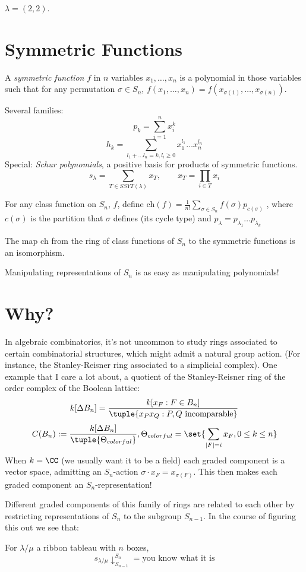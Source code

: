 \documentclass[12pt]{article}
\begin{document}
\begin{example*}
  $\lambda = (2, 2)$.
\end{example*}


\section{Symmetric Functions}
\begin{definition*}
  A \emph{symmetric function} $f$ in $n$ variables $x_1, \dots, x_n$ is a
  polynomial in those variables such that for any permutation $\sigma \in S_n$,
  $f(x_1, \dots, x_n) = f(x_{\sigma(1)}, \dots, x_{\sigma(n)})$. 
\end{definition*}
Several families: 
\[
  p_k = \sum_{i=1}^n x_i^k
\] 
\[
  h_k = \sum_{l_1 + \dots l_n = k, l_i \geq 0} x_1^{l_1} \dots x_n^{l_n}
\]
Special: \emph{Schur polynomials}, a positive basis for products of symmetric
functions.  
\[
  s_\lambda = \sum_{T \in SSYT(\lambda)} x_T, \qquad x_T = \prod_{i \in T} x_i
\] 

\begin{definition*}
  For any class function on $S_n$, $f$, define $\mathrm{ch}(f) = \frac{1}{n!}
  \sum_{\sigma \in S_n} f(\sigma) p_{c(\sigma)}$ , where $c(\sigma)$ is the
  partition that $\sigma$ defines (its cycle type) and $p_\lambda =
  p_{\lambda_1} \dots p_{\lambda_k}$ 
\end{definition*}

\begin{theorem*}
  The map $\mathrm{ch}$ from the ring of class functions of $S_n$ to the
  symmetric functions is an isomorphism.  
\end{theorem*}
Manipulating representations of $S_n$ is as easy as manipulating polynomials!

\section{Why?}
In algebraic combinatorics, it's not uncommon to study rings associated to
certain combinatorial structures, which might admit a natural group action. (For
instance, the Stanley-Reisner ring associated to a simplicial complex). One
example that I care a lot about, a quotient of the Stanley-Reisner ring of the
order complex of the Boolean lattice: 
\[
  k[\Delta B_n] = \frac{k[x_F : F \in B_n]}{\tuple{x_P x_Q : P, Q \text{
  incomparable}}}
\] 
\[
  C(B_n) := \frac{k[\Delta B_n]}{\tuple{\Theta_{colorful}}}, \Theta_{colorful} =
  \set{ \sum_{|F| = i} x_F, 0 \leq k \leq n}
\] 
When $k = \CC$ (we usually want it to be a field) each graded component is a
vector space, admitting an $S_n$-action $\sigma \cdot x_F = x_{\sigma(F)}$. This
then makes each graded component an $S_n$-representation!

Different graded components of this family of rings are related to each other by
restricting representations of $S_n$ to the subgroup $S_{n-1}$. In the course of
figuring this out we see that: 
\begin{theorem}[DHKLT 2023]
For $\lambda / \mu$ a ribbon tableau with $n$ boxes, 
\[
  s_{\lambda / \mu}\downarrow^{S_n}_{S_{n-1}} = \text{you know what it is} 
\] 
\end{theorem}
\end{document}
